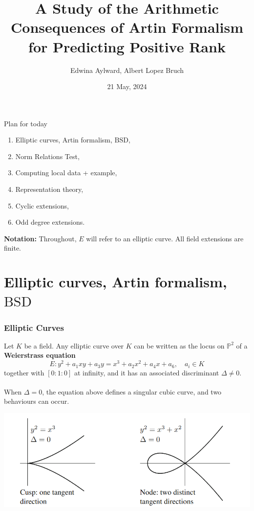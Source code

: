 \documentclass{beamer}
\title[Artin Formalism]{A Study of the Arithmetic Consequences of Artin Formalism for
Predicting Positive Rank}
\author{Edwina Aylward, Albert Lopez Bruch}
\date{21 May, 2024}
\newcommand{\BSD}{\mathrm{BSD}}
\theoremstyle{plain}
\begin{document}
\frame{\titlepage}

\begin{frame}{Plan for today}

\begin{enumerate}
    \itemsep\setlength{1em}
    \item Elliptic curves, Artin formalism, $\BSD$,
    \item Norm Relations Test,
    \item Computing local data + example, 
    \item Representation theory,
    \item Cyclic extensions,
    \item Odd degree extensions.\pause
\end{enumerate}
     
\vspace{1em}
\textbf{Notation:} Throughout, $E$ will refer to an elliptic curve. All field extensions are finite. 
\end{frame}

\section*{Elliptic curves, Artin formalism, $\BSD$}
\frame{\sectionpage}

\begin{frame}
    \frametitle{Elliptic Curves}
    Let $K$ be a field. Any elliptic curve over $K$ can be written as the locus on $\mathbb{P}^2$ of a \textbf{Weierstrass equation}
    \begin{equation}
        E:y^2+a_1xy+a_3y=x^3+a_2x^2+a_4x+a_6,\quad a_i\in K
    \end{equation}
    together with $[0:1:0]$ at infinity, and it has an associated discriminant $\Delta\neq0$. \pause
    \\~\\
    When $\Delta=0$, the equation above defines a singular cubic curve, and two behaviours can occur.
    
    \centering
    \includegraphics[scale=0.4]{Singular_cubic.png}
\end{frame}
\end{document}
